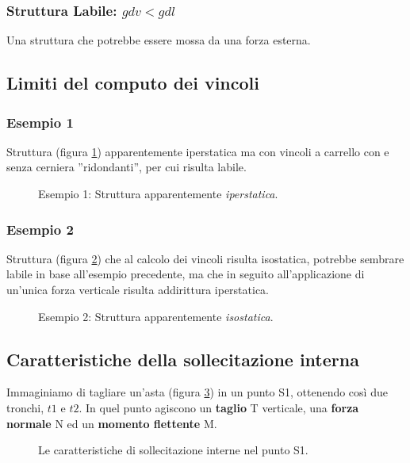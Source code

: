 \documentclass[main.tex]{subfiles}
\begin{document}
\subsubsection{Struttura Labile: $gdv < gdl$}
Una struttura che potrebbe essere mossa da una forza esterna.

\subsection{Limiti del computo dei vincoli}

\subsubsection{Esempio 1}
Struttura (figura \ref{es1}) apparentemente iperstatica ma con vincoli a carrello con e senza cerniera ”ridondanti”, per cui risulta labile.

\begin{figure}[H]
  \centering
  \resizebox{0.75\textwidth}{!}{}
  \caption{Esempio 1: Struttura apparentemente \textit{iperstatica}.}
  \label{es1}
\end{figure}

\subsubsection{Esempio 2}
Struttura (figura \ref{es2}) che al calcolo dei vincoli risulta isostatica, potrebbe sembrare labile in base all’esempio precedente, ma che in seguito all’applicazione di un’unica forza verticale risulta addirittura iperstatica.

\begin{figure}[H]
  \centering
  \resizebox{0.75\textwidth}{!}{}
  \caption{ Esempio 2: Struttura apparentemente \textit{isostatica}.}
  \label{es2}
\end{figure}

\subsection{Caratteristiche della sollecitazione interna}
Immaginiamo di tagliare un’asta (figura \ref{sollecitazione_interne}) in un punto S1, ottenendo così due tronchi, $t1$ e $t2$. In quel punto agiscono un \textbf{taglio} T verticale, una \textbf{forza normale} N ed un \textbf{momento flettente} M.

\begin{figure}[H]
  \centering
  \resizebox{0.75\textwidth}{!}{}
  \caption{Le caratteristiche di sollecitazione interne nel punto S1.}
  \label{sollecitazione_interne}
\end{figure}
\end{document}
